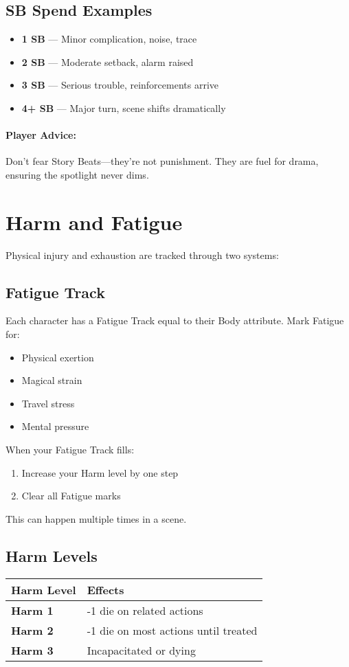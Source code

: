 \subsection*{SB Spend Examples}
\begin{itemize}
  \item \textbf{1 SB} — Minor complication, noise, trace
  \item \textbf{2 SB} — Moderate setback, alarm raised
  \item \textbf{3 SB} — Serious trouble, reinforcements arrive
  \item \textbf{4+ SB} — Major turn, scene shifts dramatically
\end{itemize}

\paragraph{Player Advice:}  
Don't fear Story Beats—they're not punishment. They are fuel for drama, ensuring the spotlight never dims.

\section{Harm and Fatigue} 

Physical injury and exhaustion are tracked through two systems:

\subsection*{Fatigue Track}
Each character has a Fatigue Track equal to their Body attribute. Mark Fatigue for:
\begin{itemize}
  \item Physical exertion
  \item Magical strain
  \item Travel stress
  \item Mental pressure
\end{itemize}

When your Fatigue Track fills:
\begin{enumerate}
  \item Increase your Harm level by one step
  \item Clear all Fatigue marks
\end{enumerate}

This can happen multiple times in a scene.

\subsection*{Harm Levels}
\begin{center}
\small
\begin{tabular}{ll}
\toprule
\textbf{Harm Level} & \textbf{Effects} \\
\midrule
\textbf{Harm 1} & -1 die on related actions \\
\textbf{Harm 2} & -1 die on most actions until treated \\
\textbf{Harm 3} & Incapacitated or dying \\
\bottomrule
\end{tabular}
\end{center}

